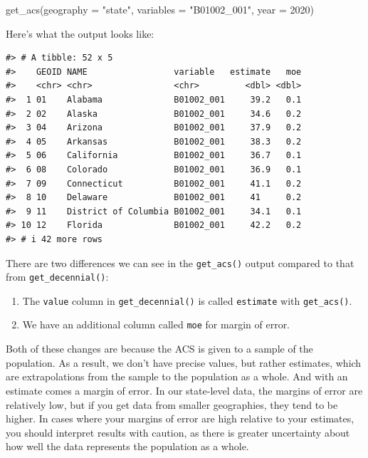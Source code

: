 \documentclass[
]{book}
\newenvironment{Shaded}{\begin{snugshade}}{\end{snugshade}}
\newcommand{\AttributeTok}[1]{\textcolor[rgb]{0.77,0.63,0.00}{#1}}
\newcommand{\DecValTok}[1]{\textcolor[rgb]{0.00,0.00,0.81}{#1}}
\newcommand{\FunctionTok}[1]{\textcolor[rgb]{0.00,0.00,0.00}{#1}}
\newcommand{\NormalTok}[1]{#1}
\newcommand{\StringTok}[1]{\textcolor[rgb]{0.31,0.60,0.02}{#1}}
\providecommand{\tightlist}{%
  \setlength{\itemsep}{0pt}\setlength{\parskip}{0pt}}
\begin{document}
\begin{Shaded}
\begin{Highlighting}[]
\FunctionTok{get\_acs}\NormalTok{(}\AttributeTok{geography =} \StringTok{"state"}\NormalTok{,}
        \AttributeTok{variables =} \StringTok{"B01002\_001"}\NormalTok{,}
        \AttributeTok{year =} \DecValTok{2020}\NormalTok{)}
\end{Highlighting}
\end{Shaded}

Here's what the output looks like:

\begin{verbatim}
#> # A tibble: 52 x 5
#>    GEOID NAME                 variable   estimate   moe
#>    <chr> <chr>                <chr>         <dbl> <dbl>
#>  1 01    Alabama              B01002_001     39.2   0.1
#>  2 02    Alaska               B01002_001     34.6   0.2
#>  3 04    Arizona              B01002_001     37.9   0.2
#>  4 05    Arkansas             B01002_001     38.3   0.2
#>  5 06    California           B01002_001     36.7   0.1
#>  6 08    Colorado             B01002_001     36.9   0.1
#>  7 09    Connecticut          B01002_001     41.1   0.2
#>  8 10    Delaware             B01002_001     41     0.2
#>  9 11    District of Columbia B01002_001     34.1   0.1
#> 10 12    Florida              B01002_001     42.2   0.2
#> # i 42 more rows
\end{verbatim}

There are two differences we can see in the \texttt{get\_acs()} output compared to that from \texttt{get\_decennial()}:

\begin{enumerate}
\def\labelenumi{\arabic{enumi}.}
\tightlist
\item
  The \texttt{value} column in \texttt{get\_decennial()} is called \texttt{estimate} with \texttt{get\_acs()}.
\item
  We have an additional column called \texttt{moe} for margin of error.
\end{enumerate}

Both of these changes are because the ACS is given to a sample of the population. As a result, we don't have precise values, but rather estimates, which are extrapolations from the sample to the population as a whole. And with an estimate comes a margin of error. In our state-level data, the margins of error are relatively low, but if you get data from smaller geographies, they tend to be higher. In cases where your margins of error are high relative to your estimates, you should interpret results with caution, as there is greater uncertainty about how well the data represents the population as a whole.
\end{document}
